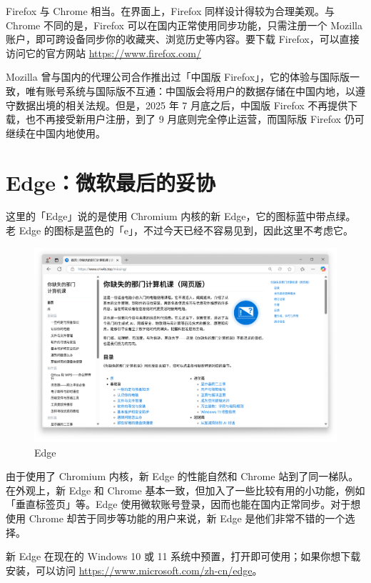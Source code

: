 Firefox 与 Chrome 相当。在界面上，Firefox 同样设计得较为合理美观。与 Chrome 不同的是，Firefox 可以在国内正常使用同步功能，只需注册一个 Mozilla 账户，即可跨设备同步你的收藏夹、浏览历史等内容。要下载 Firefox，可以直接访问它的官方网站 \url{https://www.firefox.com/}

\begin{note}
  Mozilla 曾与国内的代理公司合作推出过「中国版 Firefox」，它的体验与国际版一致，唯有账号系统与国际版不互通：中国版会将用户的数据存储在中国内地，以遵守数据出境的相关法规。但是，2025 年 7 月底之后，中国版 Firefox 不再提供下载，也不再接受新用户注册，到了 9 月底则完全停止运营，而国际版 Firefox 仍可继续在中国内地使用。
\end{note}

\section{Edge：微软最后的妥协}

这里的「Edge」说的是使用 Chromium 内核的新 Edge，它的图标蓝中带点绿。老 Edge 的图标是蓝色的「e」，不过今天已经不容易见到，因此这里不考虑它。

\begin{figure}[htb!]
  \centering
  \includegraphics[width=.85\textwidth]{assets/software/Missing_homepage_in_Edge.png}
  \caption{Edge}
  \label{fig:Missing_homepage_in_Edge}
\end{figure}

由于使用了 Chromium 内核，新 Edge 的性能自然和 Chrome 站到了同一梯队。在外观上，新 Edge 和 Chrome 基本一致，但加入了一些比较有用的小功能，例如「垂直标签页」等。Edge 使用微软账号登录，因而也能在国内正常同步。对于想使用 Chrome 却苦于同步等功能的用户来说，新 Edge 是他们非常不错的一个选择。

新 Edge 在现在的 Windows 10 或 11 系统中预置，打开即可使用；如果你想下载安装，可以访问 \url{https://www.microsoft.com/zh-cn/edge}。

